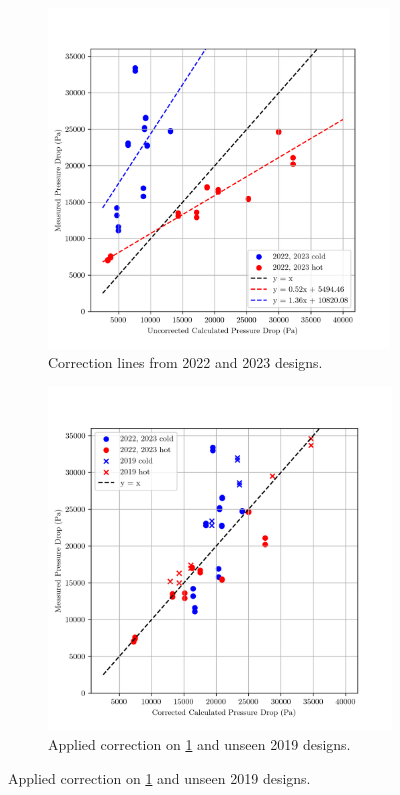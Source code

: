 \documentclass{article}
\begin{document}
\begin{figure}[H]
  \centering
  \begin{subfigure}{.49\textwidth}
    \centering
    \includegraphics[width=0.99\textwidth]{dp_ucalc_vs_meas.png}
    \caption{Correction lines from 2022 and 2023 designs.}
    \label{fig:uncorrected_pressure_drops}
  \end{subfigure}
  \begin{subfigure}{.49\textwidth}
    \centering
    \includegraphics[width=.99\linewidth]{dp_ccalc_vs_meas.png}
    \caption{Applied correction on \ref{fig:uncorrected_pressure_drops} and unseen 2019 designs.}
    \label{fig:corrected_pressure_drops}
  \end{subfigure}
    

\end{figure}
\end{document}
